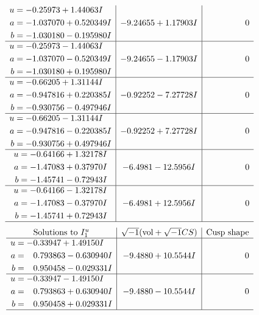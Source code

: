 \documentclass[1p]{elsarticle_modified}
\theoremstyle{definition}
\newcommand{\I}{\sqrt{-1}}
\begin{document}
$$\begin{array}{c|c|c}
\begin{aligned}
u &= -0.25973 + 1.44063 I \\
a &= -1.037070 + 0.520349 I \\
b &= -1.030180 - 0.195980 I\end{aligned}
 & -9.24655 + 1.17903 I & \phantom{-0.000000 } 0 \\ \hline\begin{aligned}
u &= -0.25973 - 1.44063 I \\
a &= -1.037070 - 0.520349 I \\
b &= -1.030180 + 0.195980 I\end{aligned}
 & -9.24655 - 1.17903 I & \phantom{-0.000000 } 0 \\ \hline\begin{aligned}
u &= -0.66205 + 1.31144 I \\
a &= -0.947816 + 0.220385 I \\
b &= -0.930756 - 0.497946 I\end{aligned}
 & -0.92252 - 7.27728 I & \phantom{-0.000000 } 0 \\ \hline\begin{aligned}
u &= -0.66205 - 1.31144 I \\
a &= -0.947816 - 0.220385 I \\
b &= -0.930756 + 0.497946 I\end{aligned}
 & -0.92252 + 7.27728 I & \phantom{-0.000000 } 0 \\ \hline\begin{aligned}
u &= -0.64166 + 1.32178 I \\
a &= -1.47083 + 0.37970 I \\
b &= -1.45741 - 0.72943 I\end{aligned}
 & -6.4981 - 12.5956 I & \phantom{-0.000000 } 0 \\ \hline\begin{aligned}
u &= -0.64166 - 1.32178 I \\
a &= -1.47083 - 0.37970 I \\
b &= -1.45741 + 0.72943 I\end{aligned}
 & -6.4981 + 12.5956 I & \phantom{-0.000000 } 0\\
 \hline 
 \end{array}$$\newpage$$\begin{array}{c|c|c}  
\text{Solutions to }I^u_{1}& \I (\text{vol} + \sqrt{-1}CS) & \text{Cusp shape}\\
 \hline 
\begin{aligned}
u &= -0.33947 + 1.49150 I \\
a &= \phantom{-}0.793863 - 0.630940 I \\
b &= \phantom{-}0.950458 - 0.029331 I\end{aligned}
 & -9.4880 + 10.5544 I & \phantom{-0.000000 } 0 \\ \hline\begin{aligned}
u &= -0.33947 - 1.49150 I \\
a &= \phantom{-}0.793863 + 0.630940 I \\
b &= \phantom{-}0.950458 + 0.029331 I\end{aligned}
 & -9.4880 - 10.5544 I & \phantom{-0.000000 } 0\\
 \hline 
 \end{array}$$\newpage\newpage\renewcommand{\arraystretch}{1}
\end{document}
